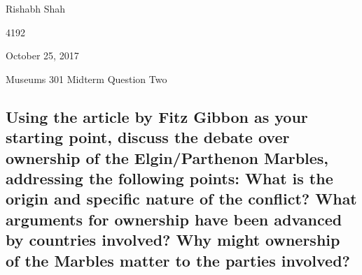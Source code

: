 \documentclass[11pt]{article}
\begin{document}
\begin{singlespacing}
{\Large\noindent Rishabh Shah

 4192

\noindent October 25, 2017

\noindent Museums 301 Midterm Question Two}
\end{singlespacing}

\begin{singlespacing}
\subsection*{Using the article by Fitz Gibbon as your starting point, discuss the debate over ownership of the Elgin/Parthenon Marbles, addressing the following points: What is the origin and specific nature of the conflict? What arguments for ownership have been advanced by countries involved? Why might ownership of the Marbles matter to the parties involved?}
\end{singlespacing}
\end{document}
